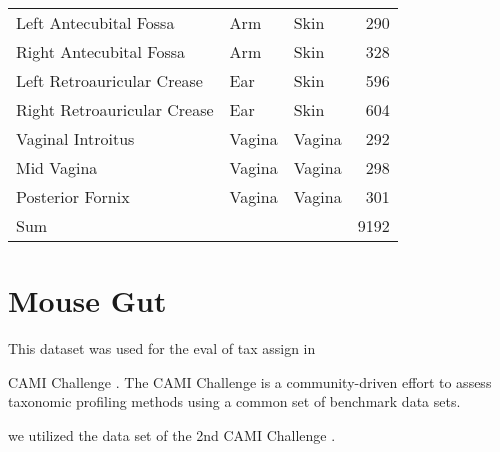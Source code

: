 \begin{table}[htb]
{\begin{center}
\begin{tabular}{lllr}
        Left Antecubital Fossa          & Arm               & Skin              & 290   \\
        Right Antecubital Fossa         & Arm               & Skin              & 328   \\
        Left Retroauricular Crease      & Ear               & Skin              & 596   \\
        Right Retroauricular Crease     & Ear               & Skin              & 604   \\
        Vaginal Introitus               & Vagina            & Vagina            & 292   \\
        Mid Vagina                      & Vagina            & Vagina            & 298   \\
        Posterior Fornix                & Vagina            & Vagina            & 301   \\
        Sum                             &                   &                   & 9192  \\
        \bottomrule
    \end{tabular}
    \end{center}
}
\end{table}

\section{Mouse Gut}
\label{supp:sec:DetailsEmpiricalDatasets:sub:MouseGut}

This dataset was used for the eval of tax assign in 

CAMI Challenge \citep{Sczyrba2017}.
The CAMI Challenge is a community-driven effort to assess taxonomic profiling methods
using a common set of benchmark data sets.


we utilized the  data set of the 2nd CAMI Challenge \citep{Bremges2018}.


